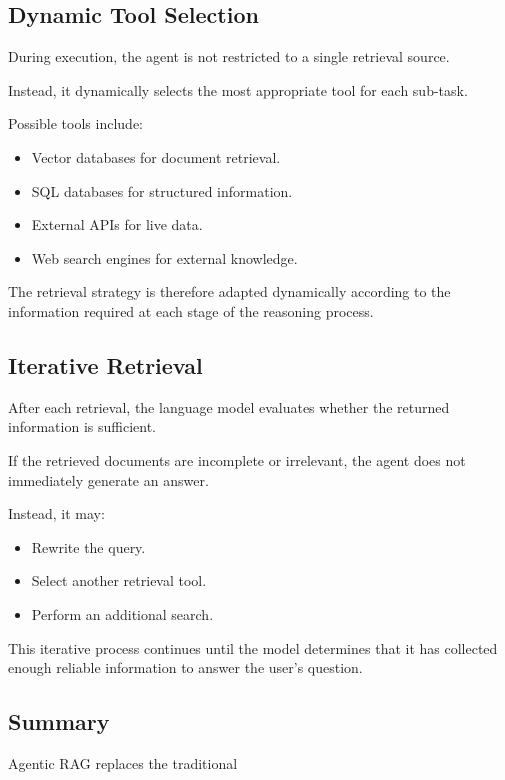 \subsection*{Dynamic Tool Selection}

During execution, the agent is not restricted to a single retrieval source.

Instead, it dynamically selects the most appropriate tool for each sub-task.

Possible tools include:

\begin{itemize}
    \item Vector databases for document retrieval.
    \item SQL databases for structured information.
    \item External APIs for live data.
    \item Web search engines for external knowledge.
\end{itemize}

The retrieval strategy is therefore adapted dynamically according to the information required at each stage of the reasoning process.

\subsection*{Iterative Retrieval}

After each retrieval, the language model evaluates whether the returned information is sufficient.

If the retrieved documents are incomplete or irrelevant, the agent does not immediately generate an answer.

Instead, it may:

\begin{itemize}
    \item Rewrite the query.
    \item Select another retrieval tool.
    \item Perform an additional search.
\end{itemize}

This iterative process continues until the model determines that it has collected enough reliable information to answer the user's question.

\subsection*{Summary}

Agentic RAG replaces the traditional

